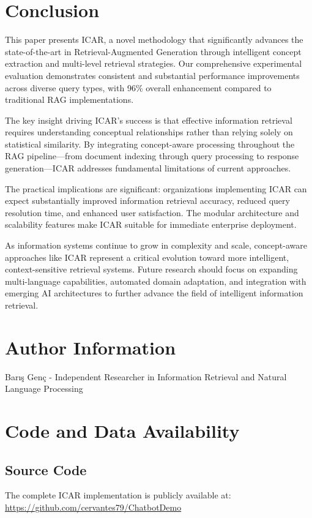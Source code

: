 \documentclass[11pt]{article}
\begin{document}
\section{Conclusion}

This paper presents ICAR, a novel methodology that significantly advances the state-of-the-art in Retrieval-Augmented Generation through intelligent concept extraction and multi-level retrieval strategies. Our comprehensive experimental evaluation demonstrates consistent and substantial performance improvements across diverse query types, with 96\% overall enhancement compared to traditional RAG implementations.

The key insight driving ICAR's success is that effective information retrieval requires understanding conceptual relationships rather than relying solely on statistical similarity. By integrating concept-aware processing throughout the RAG pipeline---from document indexing through query processing to response generation---ICAR addresses fundamental limitations of current approaches.

The practical implications are significant: organizations implementing ICAR can expect substantially improved information retrieval accuracy, reduced query resolution time, and enhanced user satisfaction. The modular architecture and scalability features make ICAR suitable for immediate enterprise deployment.

As information systems continue to grow in complexity and scale, concept-aware approaches like ICAR represent a critical evolution toward more intelligent, context-sensitive retrieval systems. Future research should focus on expanding multi-language capabilities, automated domain adaptation, and integration with emerging AI architectures to further advance the field of intelligent information retrieval.

\section*{Author Information}
Bar\i{}\c{s} Gen\c{c} - Independent Researcher in Information Retrieval and Natural Language Processing

\section*{Code and Data Availability}

\subsection*{Source Code}
The complete ICAR implementation is publicly available at: \url{https://github.com/cervantes79/ChatbotDemo}
\end{document}
